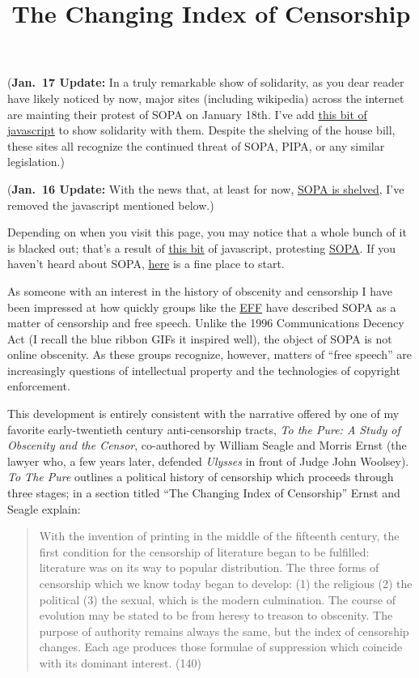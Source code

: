 \documentclass[
  12pt,
]{article}
\title{The Changing Index of Censorship}
\author{}
\date{}
\begin{document}
(\textbf{Jan.~17 Update:} In a truly remarkable show of solidarity, as
you dear reader have likely noticed by now, major sites (including
wikipedia) across the internet are mainting their protest of SOPA on
January 18th. I've add \href{http://sopablackout.org/}{this bit of
javascript} to show solidarity with them. Despite the shelving of the
house bill, these sites all recognize the continued threat of SOPA,
PIPA, or any similar legislation.)

(\textbf{Jan.~16 Update:} With the news that, at least for now,
\href{http://boingboing.net/2012/01/16/sopa-is-dead-its-evil-senate.html}{SOPA
is shelved}, I've removed the javascript mentioned below.)

Depending on when you visit this page, you may notice that a whole bunch
of it is blacked out; that's a result of
\href{https://github.com/dougmartin/Stop-Censorship}{this bit} of
javascript, protesting
\href{http://en.wikipedia.org/wiki/Stop_Online_Piracy_Act}{SOPA}. If you
haven't heard about SOPA,
\href{http://www.theverge.com/2011/12/22/2648219/stop-online-piracy-act-sopa-what-is-it}{here}
is a fine place to start.

As someone with an interest in the history of obscenity and censorship I
have been impressed at how quickly groups like the
\href{http://eff.org}{EFF} have described SOPA as a matter of censorship
and free speech. Unlike the 1996 Communications Decency Act (I recall
the blue ribbon GIFs it inspired well), the object of SOPA is not online
obscenity. As these groups recognize, however, matters of ``free
speech'' are increasingly questions of intellectual property and the
technologies of copyright enforcement.

This development is entirely consistent with the narrative offered by
one of my favorite early-twentieth century anti-censorship tracts,
\emph{To the Pure: A Study of Obscenity and the Censor}, co-authored by
William Seagle and Morris Ernst (the lawyer who, a few years later,
defended \emph{Ulysses} in front of Judge John Woolsey). \emph{To The
Pure} outlines a political history of censorship which proceeds through
three stages; in a section titled ``The Changing Index of Censorship''
Ernst and Seagle explain:

\begin{quote}
With the invention of printing in the middle of the fifteenth century,
the first condition for the censorship of literature began to be
fulfilled: literature was on its way to popular distribution. The three
forms of censorship which we know today began to develop: (1) the
religious (2) the political (3) the sexual, which is the modern
culmination. The course of evolution may be stated to be from heresy to
treason to obscenity. The purpose of authority remains always the same,
but the index of censorship changes. Each age produces those formulae of
suppression which coincide with its dominant interest. (140)
\end{quote}
\end{document}
